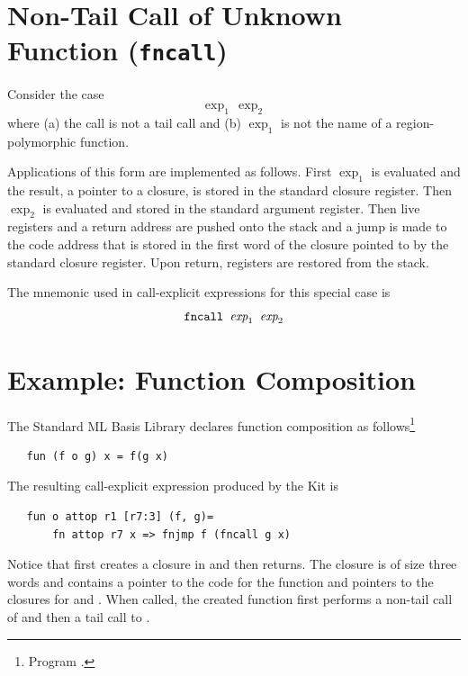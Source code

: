 \documentclass[12pt]{book}
\begin{document}
\section{Non-Tail Call of Unknown Function ({\tt fncall})}
Consider the case
$$\exp_1\,\exp_2$$
where (a) the call is not a tail call and (b)
$\exp_1$ is not the name of a region-polymorphic function.

Applications of this form are implemented as follows. First $\exp_1$
is evaluated and the result, a pointer to a closure, is stored in the
%
%
standard closure register. Then $\exp_2$ is evaluated and stored in
the 
%
%
standard argument register.  Then live registers and a return
address are pushed onto the stack and a jump is made to the code
address that is stored in the first word of the closure pointed to by
the standard closure register. Upon return, registers are restored
from the stack.

The mnemonic used in call-explicit expressions for this special case is
$$\hbox{\tt fncall $\hbox{\it exp}_1$ $\hbox{\it exp}_2$}$$

\section{Example: Function Composition}
The Standard ML Basis Library declares function composition as
follows\footnote{Program .}
\begin{verbatim}
   fun (f o g) x = f(g x)
\end{verbatim}
The resulting call-explicit expression produced by the Kit is
\begin{verbatim}
   fun o attop r1 [r7:3] (f, g)= 
       fn attop r7 x => fnjmp f (fncall g x)
\end{verbatim}
Notice that 
%
 first creates a closure in  and then returns.
The closure is of size three words and contains a pointer to the code
for the function and pointers to the closures for  and
. When called, the created function first performs a non-tail
call of  and then a tail call to .
\end{document}

